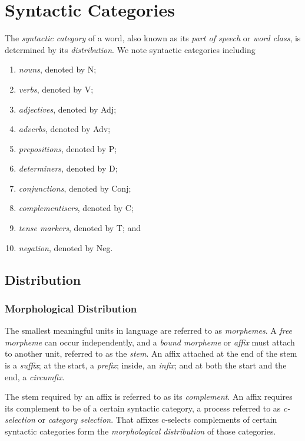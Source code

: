 



\section{Syntactic Categories}

The \emph{syntactic category} of a word, also known as its \emph{part of speech} or \emph{word class}, is determined by
its \emph{distribution}. We note syntactic categories including
\begin{enumerate}
  \item \emph{nouns}, denoted by N;
  \item \emph{verbs}, denoted by V;
  \item \emph{adjectives}, denoted by Adj;
  \item \emph{adverbs}, denoted by Adv;
  \item \emph{prepositions}, denoted by P;
  \item \emph{determiners}, denoted by D;
  \item \emph{conjunctions}, denoted by Conj;
  \item \emph{complementisers}, denoted by C;
  \item \emph{tense markers}, denoted by T; and
  \item \emph{negation}, denoted by Neg.
\end{enumerate}

\subsection{Distribution}

\subsubsection{Morphological Distribution}

The smallest meaningful units in language are referred to as \emph{morphemes}. A \emph{free morpheme} can occur
independently, and a \emph{bound morpheme} or \emph{affix} must attach to another unit, referred to as the \emph{stem}.
An affix attached at the end of the stem is a \emph{suffix}; at the start, a \emph{prefix}; inside, an \emph{infix}; and
at both the start and the end, a \emph{circumfix}.

The stem required by an affix is referred to as its \emph{complement}. An affix requires its complement to be of a
certain syntactic category, a process referred to as \emph{c-selection} or \emph{category selection}. That affixes
c-selects complements of certain syntactic categories form the \emph{morphological distribution} of those categories.

